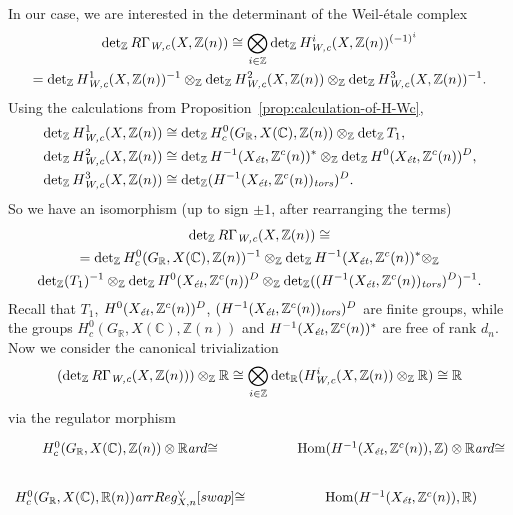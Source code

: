 \documentclass[draft]{article}
\DeclareMathOperator{\Hom}{Hom}
\newcommand{\CC}{\mathbb{C}}
\newcommand{\RR}{\mathbb{R}}
\newcommand{\ZZ}{\mathbb{Z}}
\renewcommand{\det}{\operatorname{det}}
\newcommand{\ar}{\text{\it ar}}
\newcommand{\et}{\text{\it \'{e}t}}
\newcommand{\tors}{\text{\it tors}}
\newcommand{\Wc}{\text{\it W,c}}
\theoremstyle{myplain}
\theoremstyle{mydefinition}
\begin{document}
In our case, we are interested in the determinant of the Weil-\'{e}tale complex
\begin{multline*}
  \det_\ZZ R\Gamma_\Wc (X, \ZZ(n)) \cong
  \bigotimes_{i \in \ZZ} \det_\ZZ H^i_\Wc (X, \ZZ(n))^{(-1)^i} \\
  =
  \det_\ZZ H^1_\Wc (X, \ZZ(n))^{-1} \otimes_\ZZ
  \det_\ZZ H^2_\Wc (X, \ZZ(n)) \otimes_\ZZ
  \det_\ZZ H^3_\Wc (X, \ZZ(n))^{-1}.
\end{multline*}
Using the calculations from Proposition~\ref{prop:calculation-of-H-Wc},
\begin{align*}
  \det_\ZZ H^1_\Wc (X, \ZZ(n)) & \cong \det_\ZZ H^0_c (G_\RR, X(\CC), \ZZ(n)) \otimes_\ZZ \det_\ZZ T_1, \\
  \det_\ZZ H^2_\Wc (X, \ZZ(n)) & \cong \det_\ZZ H^{-1} (X_\et, \ZZ^c(n))^* \otimes_\ZZ \det_\ZZ H^0 (X_\et, \ZZ^c(n))^D, \\
  \det_\ZZ H^3_\Wc (X, \ZZ(n)) & \cong \det_\ZZ (H^{-1} (X_\et, \ZZ^c(n))_\tors)^D.
\end{align*}
So we have an isomorphism (up to sign $\pm 1$, after rearranging the terms)
\begin{multline*}
  \det_\ZZ R\Gamma_\Wc (X, \ZZ(n)) \cong \\
  =
  \det_\ZZ H^0_c (G_\RR, X(\CC), \ZZ(n))^{-1} \otimes_\ZZ
  \det_\ZZ H^{-1} (X_\et, \ZZ^c(n))^* \otimes_\ZZ \\
  \det_\ZZ (T_1)^{-1} \otimes_\ZZ  \det_\ZZ H^0 (X_\et, \ZZ^c(n))^D \otimes_\ZZ \det_\ZZ ((H^{-1} (X_\et, \ZZ^c(n))_\tors)^D)^{-1}.
\end{multline*}
Recall that $T_1$, $H^0 (X_\et, \ZZ^c(n))^D$,
$(H^{-1} (X_\et, \ZZ^c(n))_\tors)^D$ are finite groups, while the groups
$H^0_c (G_\RR, X(\CC), \ZZ(n))$ and $H^{-1} (X_\et, \ZZ^c(n))^*$ are free of
rank $d_n$. Now we consider the canonical trivialization
\[ (\det_\ZZ R\Gamma_\Wc (X, \ZZ(n))) \otimes_\ZZ \RR \cong
  \bigotimes_{i\in \ZZ} \det_\RR (H^i_\Wc (X, \ZZ(n))\otimes_\ZZ \RR)
  \cong \RR \]
via the regulator morphism
\[ \begin{tikzcd}[column sep=3em]
    H^0_c (G_\RR, X(\CC), \ZZ(n)) \otimes \RR\ar{d}{\cong} & \Hom (H^{-1} (X_\et, \ZZ^c (n)), \ZZ) \otimes \RR\ar{d}{\cong} \\
    H^0_c (G_\RR, X(\CC), \RR (n)) \ar{r}{Reg^\vee_{X,n}}[swap]{\cong} & \Hom (H^{-1} (X_\et, \ZZ^c (n)), \RR)
  \end{tikzcd} \]
\end{document}
